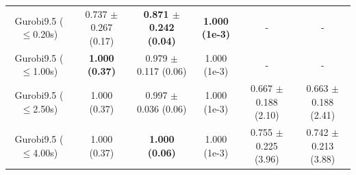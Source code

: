 \begin{table}[t]
\begin{minipage}{1.00 \linewidth}
{\begin{tabular}{@{}cccccc@{}}
Gurobi9.5 ($\leq$0.20s)   & 0.737 \hspace{-0.3mm}$\pm$\hspace{-0.3mm} 0.267 (0.17)&  \textbf{0.871 \hspace{-0.3mm}$\pm$\hspace{-0.3mm} 0.242 (0.04)} & \textbf{1.000 (1e-3)}  &  -    &    -    \\
Gurobi9.5 ($\leq$1.00s)   & \textbf{1.000 (0.37)}& 0.979 \hspace{-0.3mm}$\pm$\hspace{-0.3mm} 0.117 (0.06)& 1.000 (1e-3)  &   -   &    -    \\
Gurobi9.5 ($\leq$2.50s)   &1.000 (0.37)& 0.997 \hspace{-0.3mm}$\pm$\hspace{-0.3mm} 0.036 (0.06) & 1.000 (1e-3)  &  0.667 \hspace{-0.3mm}$\pm$\hspace{-0.3mm} 0.188 (2.10)    &    0.663 \hspace{-0.3mm}$\pm$\hspace{-0.3mm} 0.188 (2.41)    \\
Gurobi9.5 ($\leq$4.00s)   & 1.000 (0.37)& \textbf{1.000 (0.06)} & 1.000 (1e-3)  &  0.755 \hspace{-0.3mm}$\pm$\hspace{-0.3mm} 0.225 (3.96) &    0.742 \hspace{-0.3mm}$\pm$\hspace{-0.3mm} 0.213 (3.88)    \\
 \bottomrule
\end{tabular}}


\end{minipage}
\end{table}
